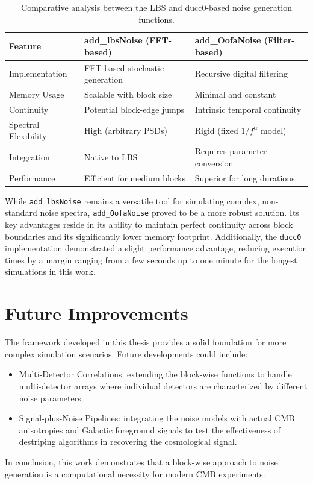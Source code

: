 \begin{table}[h!]
\centering
\begin{tabular}{lll}
\toprule
\textbf{Feature} & \textbf{add\_lbsNoise (FFT-based)} & \textbf{add\_OofaNoise (Filter-based)} \\ \midrule
Implementation & FFT-based stochastic generation & Recursive digital filtering \\
Memory Usage & Scalable with block size & Minimal and constant \\
Continuity & Potential block-edge jumps & Intrinsic temporal continuity \\
Spectral Flexibility & High (arbitrary PSDs) & Rigid (fixed $1/f^\alpha$ model) \\
Integration & Native to LBS & Requires parameter conversion \\
Performance & Efficient for medium blocks & Superior for long durations \\ \bottomrule
\end{tabular}
\caption{Comparative analysis between the LBS and ducc0-based noise generation functions.}
\label{tab:comparison_models}
\end{table}

While \texttt{add\_lbsNoise} remains a versatile tool for simulating complex, non-standard noise spectra, \texttt{add\_OofaNoise} proved to be a more robust solution. Its key advantages reside in its ability to maintain perfect continuity across block boundaries and its significantly lower memory footprint. Additionally, the \texttt{ducc0} implementation demonstrated a slight performance advantage, reducing execution times by a margin ranging from a few seconds up to one minute for the longest simulations in this work.



\section{Future Improvements}
The framework developed in this thesis provides a solid foundation for more complex simulation scenarios. Future developments could include:

\begin{itemize}
    \item Multi-Detector Correlations: extending the block-wise functions to handle multi-detector arrays where individual detectors are characterized by different noise parameters.
    \item Signal-plus-Noise Pipelines: integrating the noise models with actual CMB anisotropies and Galactic foreground signals to test the effectiveness of destriping algorithms in recovering the cosmological signal.
\end{itemize}

In conclusion, this work demonstrates that a block-wise approach to noise generation is a computational necessity for modern CMB experiments.


